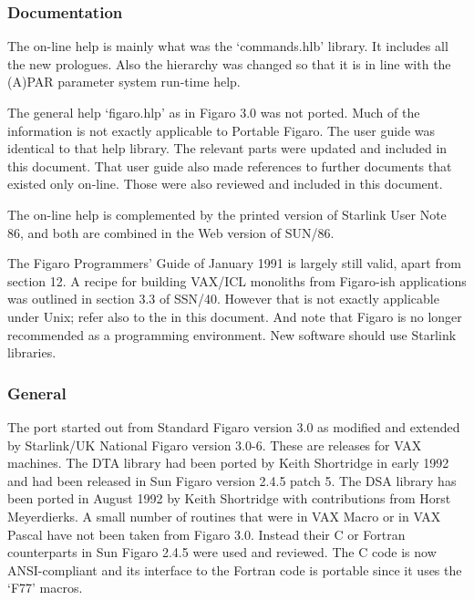 
\subsubsection{\label{changessub1}Documentation}

   The on-line help is mainly what was the `commands.hlb' library. It
   includes all the new prologues. Also
   the hierarchy was changed so that it is in line with the (A)PAR
   parameter system run-time help.

   The general help `figaro.hlp' as in Figaro 3.0 was not ported. Much
   of the information is not exactly applicable to Portable Figaro. The
   user guide was identical to that help library. The relevant parts
   were updated and included in this document. That user guide also made
   references to further documents that existed only on-line. Those were
   also reviewed and included in this document.

   The on-line help is complemented by the printed version of Starlink
   User Note 86, and both are combined in the Web version of SUN/86.

   The Figaro Programmers' Guide of January 1991 is largely still
   valid, apart from section 12. A recipe for building VAX/ICL monoliths from
   Figaro-ish applications was outlined in section 3.3 of SSN/40.
   However that is not exactly applicable under Unix; refer also to
   the  in this document. And
   note that Figaro is no longer recommended as a programming
   environment. New software should use Starlink libraries.


\subsubsection{\label{changessub2}General}

   The port started out from Standard Figaro version 3.0 as modified and
   extended by Starlink/UK National Figaro version 3.0-6. These are
   releases for VAX machines. The DTA library had been ported by Keith
   Shortridge in early 1992 and had been released in Sun Figaro version
   2.4.5 patch 5. The DSA library has been ported in August 1992 by
   Keith Shortridge with contributions from Horst Meyerdierks. A small
   number of routines that were in VAX Macro or in VAX Pascal have not
   been taken from Figaro 3.0. Instead their C or Fortran counterparts
   in Sun Figaro 2.4.5 were used and reviewed. The C code is now
   ANSI-compliant and its interface to the Fortran code is portable
   since it uses the `F77' macros.

